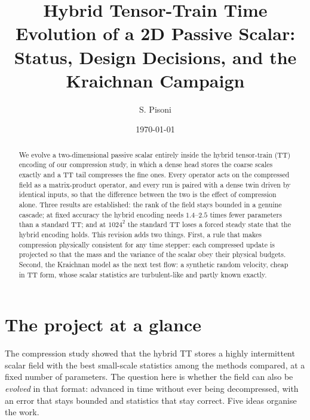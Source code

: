 \documentclass[aps,prfluids,reprint,onecolumn,amsmath,amssymb,nofootinbib,floatfix]{revtex4-2}
\begin{document}
\title{Hybrid Tensor-Train Time Evolution of a 2D Passive Scalar:\\
Status, Design Decisions, and the Kraichnan Campaign}

\author{S. Pisoni}

\date{\today}

\begin{abstract}
We evolve a two-dimensional passive scalar entirely inside the hybrid
tensor-train (TT) encoding of our compression study, in which a dense head
stores the coarse scales exactly and a TT tail compresses the fine ones. Every
operator acts on the compressed field as a matrix-product operator, and every run
is paired with a dense twin driven by identical inputs, so that the difference
between the two is the effect of compression alone. Three results are
established: the rank of the field stays bounded in a genuine cascade; at fixed
accuracy the hybrid encoding needs $1.4$--$2.5$ times fewer parameters than a
standard TT; and at $1024^2$ the standard TT loses a forced steady state that the
hybrid encoding holds. This revision adds two things. First, a rule that makes
compression physically consistent for any time stepper: each compressed update
is projected so that the mass and the variance of the scalar obey their physical
budgets. Second, the
Kraichnan model as the next test flow: a synthetic random velocity, cheap in TT
form, whose scalar statistics are turbulent-like and partly known exactly.
\end{abstract}

\maketitle

\section{The project at a glance}

The compression study showed that the hybrid TT stores a highly intermittent
scalar field with the best small-scale statistics among the methods compared, at
a fixed number of parameters. The question here is whether the field can also be
\emph{evolved} in that format: advanced in time without ever being
decompressed, with an error that stays bounded and statistics that stay
correct. Five ideas organise the work.
\end{document}
